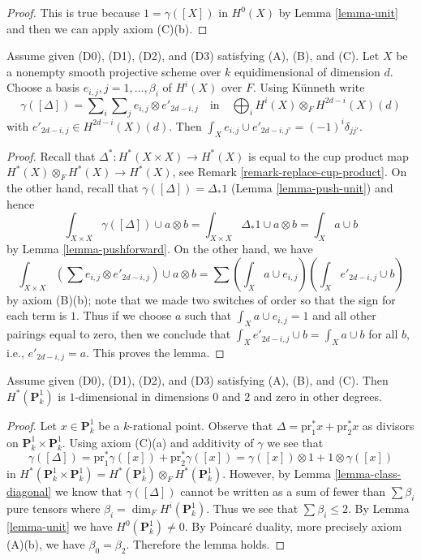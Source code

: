 \begin{proof}
This is true because $1 = \gamma([X])$ in $H^0(X)$ by Lemma \ref{lemma-unit}
and then we can apply axiom (C)(b).
\end{proof}

\begin{lemma}
\label{lemma-class-diagonal}
Assume given (D0), (D1), (D2), and (D3) satisfying (A), (B), and (C).
Let $X$ be a nonempty smooth projective scheme over $k$ equidimensional
of dimension $d$. Choose a basis $e_{i, j}, j = 1, \ldots, \beta_i$ of
$H^i(X)$ over $F$. Using K\"unneth write
$$
\gamma([\Delta]) =
\sum\nolimits_i
\sum\nolimits_j e_{i, j} \otimes e'_{2d - i , j}
\quad\text{in}\quad
\bigoplus\nolimits_i H^i(X) \otimes_F H^{2d - i}(X)(d)
$$
with $e'_{2d - i, j} \in H^{2d - i}(X)(d)$.
Then $\int_X e_{i, j} \cup e'_{2d - i, j'} = (-1)^i\delta_{jj'}$.
\end{lemma}

\begin{proof}
Recall that $\Delta^* : H^*(X \times X) \to H^*(X)$ is equal to the
cup product map $H^*(X) \otimes_F H^*(X) \to H^*(X)$, see
Remark \ref{remark-replace-cup-product}. On the other
hand, recall that $\gamma([\Delta]) = \Delta_*1$ (Lemma \ref{lemma-push-unit})
and hence
$$
\int_{X \times X} \gamma([\Delta]) \cup a \otimes b =
\int_{X \times X} \Delta_*1 \cup a \otimes b =
\int_X a \cup b
$$
by Lemma \ref{lemma-pushforward}.
On the other hand, we have
$$
\int_{X \times X} (\sum e_{i, j} \otimes e'_{2d -i , j}) \cup a \otimes b =
\sum (\int_X a \cup e_{i, j})(\int_X e'_{2d - i, j} \cup b)
$$
by axiom (B)(b); note that we made two switches of order so that the sign
for each term is $1$. Thus if we choose $a$ such that
$\int_X a \cup e_{i, j} = 1$ and all other pairings equal to zero, then
we conclude that $\int_X e'_{2d - i, j} \cup b = \int_X a \cup b$
for all $b$, i.e., $e'_{2d - i, j} = a$. This proves the lemma.
\end{proof}

\begin{lemma}
\label{lemma-cohomology-P1}
Assume given (D0), (D1), (D2), and (D3) satisfying (A), (B), and (C).
Then $H^*(\mathbf{P}^1_k)$ is $1$-dimensional in dimensions $0$ and $2$
and zero in other degrees.
\end{lemma}

\begin{proof}
Let $x \in \mathbf{P}^1_k$ be a $k$-rational point. Observe that
$\Delta = \text{pr}_1^*x + \text{pr}_2^*x$ as divisors on
$\mathbf{P}^1_k \times \mathbf{P}^1_k$. Using axiom (C)(a)
and additivity of $\gamma$ we see that
$$
\gamma([\Delta]) =
\text{pr}_1^*\gamma([x]) +
\text{pr}_2^*\gamma([x]) =
\gamma([x]) \otimes 1 + 1 \otimes \gamma([x])
$$
in $H^*(\mathbf{P}^1_k \times \mathbf{P}^1_k) =
H^*(\mathbf{P}^1_k) \otimes_F H^*(\mathbf{P}^1_k)$.
However, by Lemma \ref{lemma-class-diagonal}
we know that $\gamma([\Delta])$ cannot be written
as a sum of fewer than $\sum \beta_i$ pure tensors
where $\beta_i = \dim_F H^i(\mathbf{P}^1_k)$.
Thus we see that $\sum \beta_i \leq 2$.
By Lemma \ref{lemma-unit} we have $H^0(\mathbf{P}^1_k) \not = 0$.
By Poincar\'e duality, more precisely axiom (A)(b),
we have $\beta_0 = \beta_2$. Therefore the lemma holds.
\end{proof}

